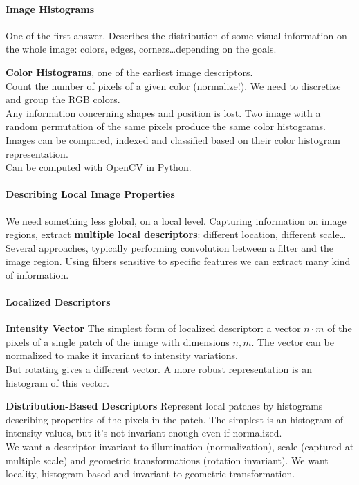 \documentclass[10pt]{report}
\begin{document}
\paragraph{Image Histograms} One of the first answer. Describes the distribution of some visual information on the whole image: colors, edges, corners\ldots depending on the goals.\begin{list}{}{}
	\item \textbf{Color Histograms}, one of the earliest image descriptors.\\
	Count the number of pixels of a given color (normalize!). We need to discretize and group the RGB colors.\\
	Any information concerning shapes and position is lost. Two image with a random permutation of the same pixels produce the same color histograms.\\
	Images can be compared, indexed and classified based on their color histogram representation.\\
	Can be computed with OpenCV in Python.
\end{list}
\paragraph{Describing Local Image Properties} We need something less global, on a local level. Capturing information on image regions, extract \textbf{multiple local descriptors}: different location, different scale\ldots\\
Several approaches, typically performing convolution between a filter and the image region. Using filters sensitive to specific features we can extract many kind of information.
\paragraph{Localized Descriptors}
\begin{list}{}{}
	\item \textbf{Intensity Vector} The simplest form of localized descriptor: a vector $n\cdot m$ of the pixels of a single patch of the image with dimensions $n,m$. The vector can be normalized to make it invariant to intensity variations.\\
	But rotating gives a different vector. A more robust representation is an histogram of this vector.
	\item \textbf{Distribution-Based Descriptors} Represent local patches by histograms describing properties of the pixels in the patch. The simplest is an histogram of intensity values, but it's not invariant enough even if normalized.\\
	We want a descriptor invariant to illumination (normalization), scale (captured at multiple scale) and geometric transformations (rotation invariant). We want locality, histogram based and invariant to geometric transformation.
\end{list}
\end{document}

